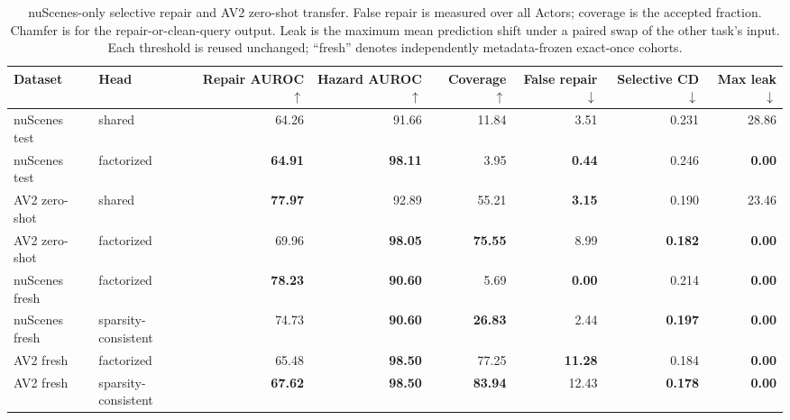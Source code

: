 \begin{table}[t]
  \centering
  \caption{nuScenes-only selective repair and AV2 zero-shot transfer. False repair is measured over all Actors; coverage is
  the accepted fraction. Chamfer is for the repair-or-clean-query output. Leak is the maximum mean prediction shift under a
  paired swap of the other task's input. Each threshold is reused unchanged; ``fresh'' denotes independently metadata-frozen
  exact-once cohorts.}
  \label{tab:p4-selective}
  \small
  \setlength{\tabcolsep}{3.7pt}
  \begin{tabular}{llrrrrrr}
    \toprule
    Dataset & Head & Repair AUROC $\uparrow$ & Hazard AUROC $\uparrow$ & Coverage $\uparrow$ & False repair $\downarrow$ & Selective CD $\downarrow$ & Max leak $\downarrow$ \\
    \midrule
    nuScenes test & shared & 64.26 & 91.66 & 11.84 & 3.51 & 0.231 & 28.86 \\
    nuScenes test & factorized & \textbf{64.91} & \textbf{98.11} & 3.95 & \textbf{0.44} & 0.246 & \textbf{0.00} \\
    AV2 zero-shot & shared & \textbf{77.97} & 92.89 & 55.21 & \textbf{3.15} & 0.190 & 23.46 \\
    AV2 zero-shot & factorized & 69.96 & \textbf{98.05} & \textbf{75.55} & 8.99 & \textbf{0.182} & \textbf{0.00} \\
    nuScenes fresh & factorized & \textbf{78.23} & \textbf{90.60} & 5.69 & \textbf{0.00} & 0.214 & \textbf{0.00} \\
    nuScenes fresh & sparsity-consistent & 74.73 & \textbf{90.60} & \textbf{26.83} & 2.44 & \textbf{0.197} & \textbf{0.00} \\
    AV2 fresh & factorized & 65.48 & \textbf{98.50} & 77.25 & \textbf{11.28} & 0.184 & \textbf{0.00} \\
    AV2 fresh & sparsity-consistent & \textbf{67.62} & \textbf{98.50} & \textbf{83.94} & 12.43 & \textbf{0.178} & \textbf{0.00} \\
    \bottomrule
  \end{tabular}
\end{table}
